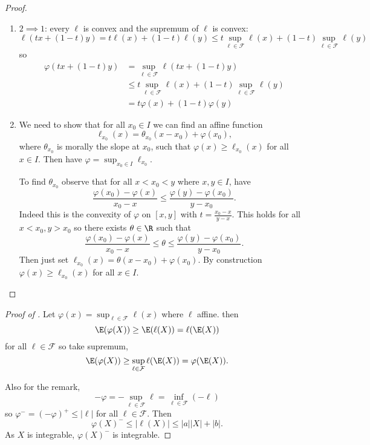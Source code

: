 \documentclass[a4paper]{article}
\begin{document}
\begin{proof}\leavevmode
  \begin{enumerate}
  \item \(2 \implies 1\): every \(\ell\) is convex and the supremum of \(\ell\) is convex:
    \[
      \ell(t x + (1 - t) y) = t \ell(x) + (1 - t) \ell(y) \leq t \sup_{\ell \in \mathcal F} \ell(x) + (1 - t) \sup_{\ell \in \mathcal F} \ell(y)
    \]
    so
    \begin{align*}
      \varphi(tx + (1 - t)y)
      &= \sup_{\ell \in \mathcal F} \ell( t x + (1 - t) y) \\
      &\leq t \sup_{\ell \in \mathcal F} \ell(x) + (1 - t) \sup_{\ell \in \mathcal F} \ell(y) \\
      &= t \varphi(x) + (1 - t) \varphi(y)
    \end{align*}
  \item We need to show that for all \(x_0 \in I\) we can find an affine function
    \[
      \ell_{x_0}(x) = \theta_{x_0} (x - x_0) + \varphi(x_0),
    \]
    where \(\theta_{x_0}\) is morally the slope at \(x_0\), such that \(\varphi(x) \geq \ell_{x_0}(x)\) for all \(x \in I\). Then have \(\varphi = \sup_{x_0 \in I} \ell_{x_0}\).

    To find \(\theta_{x_0}\) observe that for all \(x < x_0 < y\) where \(x, y \in I\), have
    \[
      \frac{\varphi(x_0) - \varphi(x)}{x_0 - x} \leq \frac{\varphi(y) - \varphi(x_0)}{y - x_0}.
    \]
    Indeed this is the convexity of \(\varphi\) on \([x, y]\) with \(t = \frac{x_0 - x}{y - x}\). This holds for all \(x < x_0, y > x_0\) so there exists \(\theta \in \R\) such that
    \[
      \frac{\varphi(x_0) - \varphi(x)}{x_0 - x} \leq \theta \leq \frac{\varphi(y) - \varphi(x_0)}{y - x_0}.
    \]
    Then just set \(\ell_{x_0}(x) = \theta(x - x_0) + \varphi(x_0)\). By construction \(\varphi(x) \geq \ell_{x_0}(x)\) for all \(x \in I\).
  \end{enumerate}
\end{proof}

\begin{proof}[Proof of ]
  Let \(\varphi(x) = \sup_{\ell \in \mathcal F} \ell(x)\) where \(\ell\) affine. then
    \[
      \E(\varphi(X)) \geq \E(\ell(X)) = \ell(\E(X))
    \]
    for all \(\ell \in \mathcal F\) so take supremum,
    \[
      \E(\varphi(X)) \geq \sup_{\ell \in \mathcal F} \ell(\E(X)) = \varphi(\E(X)).
    \]

    Also for the remark,
    \[
      - \varphi = - \sup_{\ell \in \mathcal F} \ell = \inf_{\ell \in \mathcal F} (-\ell)
    \]
    so \(\varphi^- = (-\varphi)^+ \leq |\ell|\) for all \(\ell \in \mathcal F\). Then
    \[
      \varphi(X)^- \leq |\ell(X)| \leq |a| |X| + |b|.
    \]
    As \(X\) is integrable, \(\varphi(X)^-\) is integrable.
\end{proof}
\end{document}
